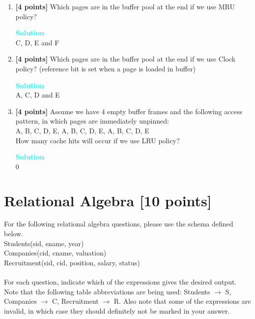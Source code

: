 \documentclass[10pt]{article}
\newenvironment{solution}
    { \begin{mdframed}[backgroundcolor=gray!10] \textcolor{cyan}{\textbf{Solution}} \\}
    {  \end{mdframed}}
\begin{document}
\begin{enumerate}
    \item \textbf{[4 points]}
    Which pages are in the buffer pool at the end if we use MRU policy?   \\
	\begin{solution}
    C, D, E and F
	\end{solution}
    
    \item \textbf{[4 points]}
    Which pages are in the buffer pool at the end if we use Clock policy? (reference bit is set when a page is loaded in buffer)  \\
	\begin{solution}
    A, C, D and E
	\end{solution}
    
    \item \textbf{[4 points]}
    Assume we have 4 empty buffer frames and the following access pattern, in which pages are immediately unpinned: \\
    A, B, C, D, E, A, B, C, D, E, A, B, C, D, E \\
    How many cache hits will occur if we use LRU policy?
	\begin{solution}
     0
	\end{solution}

\end{enumerate}




\newpage
\section{Relational Algebra \textbf{[10 points]}}
For the following relational algebra questions, please use the schema
defined below.\\

Students(sid, sname, year) \\

Companies(cid, cname, valuation) \\

Recruitment(sid, cid, position, salary, status) \\
\\
For each question, indicate which of the expressions gives the desired
output. Note that the following table abbreviations are being used:
Students $\rightarrow$ S, Companies $\rightarrow$ C, Recruitment
$\rightarrow$ R. Also note that some of the expressions are invalid,
in which case they should definitely not be marked in your answer.
\end{document}
